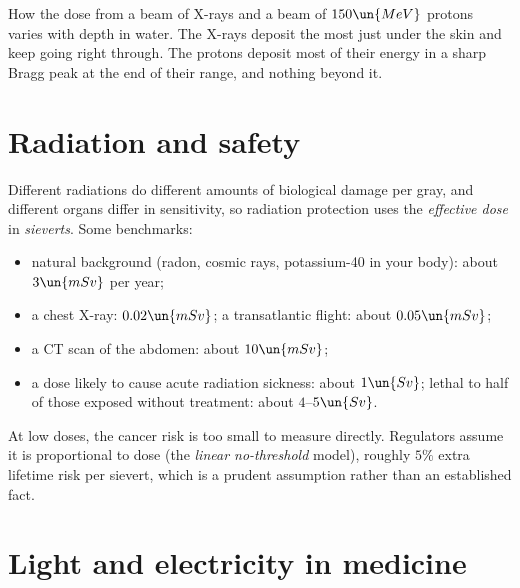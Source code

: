 \begin{center}
\begin{minipage}{\linewidth}

{\small How the dose from a beam of X-rays and a beam of $150\un{MeV}$ protons varies with depth in water. The X-rays deposit the most just under the skin and keep going right through. The protons deposit most of their energy in a sharp Bragg peak at the end of their range, and nothing beyond it.}
\end{minipage}
\end{center}

\section{Radiation and safety}

Different radiations do different amounts of biological damage per gray, and different organs differ in sensitivity, so radiation protection uses the \emph{effective dose} in \emph{sieverts}. Some benchmarks:
\begin{itemize}[itemsep=2pt]
  \item natural background (radon, cosmic rays, potassium-40 in your body): about $3\un{mSv}$ per year;
  \item a chest X-ray: $0.02\un{mSv}$; a transatlantic flight: about $0.05\un{mSv}$;
  \item a CT scan of the abdomen: about $10\un{mSv}$;
  \item a dose likely to cause acute radiation sickness: about $1\un{Sv}$; lethal to half of those exposed without treatment: about $4$--$5\un{Sv}$.
\end{itemize}
At low doses, the cancer risk is too small to measure directly. Regulators assume it is proportional to dose (the \emph{linear no-threshold} model), roughly $5\%$ extra lifetime risk per sievert, which is a prudent assumption rather than an established fact.

\section{Light and electricity in medicine}

